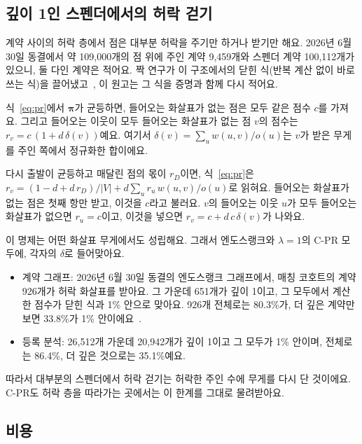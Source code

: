 \subsection{깊이 1인 스펜더에서의 허락 걷기}
\label{sec:closed}

계약 사이의 허락 층에서 점은 대부분 허락을 주기만 하거나 받기만 해요. 2026년 6월 30일 동결에서 약 109,000개의 점 위에 주인 계약 9,459개와 스펜더 계약 100,112개가 있으니, 둘 다인 계약은 적어요. 짝 연구가 이 구조에서의 닫힌 식(반복 계산 없이 바로 쓰는 식)을 끌어냈고~\cite{kwon2026companion}, 이 원고는 그 식을 증명과 함께 다시 적어요.

\begin{proposition}
\label{prop:closed}
식~\eqref{eq:pr}에서 $\boldsymbol\pi$가 균등하면, 들어오는 화살표가 없는 점은 모두 같은 점수 $c$를 가져요. 그리고 들어오는 이웃이 모두 들어오는 화살표가 없는 점 $v$의 점수는 $r_v=c\,(1+d\,\delta(v))$예요. 여기서 $\delta(v)=\sum_u w(u,v)/o(u)$는 $v$가 받은 무게를 주인 쪽에서 정규화한 합이에요.
\end{proposition}

\begin{proofko}
다시 출발이 균등하고 매달린 점의 몫이 $r_D$이면, 식~\eqref{eq:pr}은 $r_v=(1-d+d\,r_D)/|V|+d\sum_u r_u\,w(u,v)/o(u)$로 읽혀요. 들어오는 화살표가 없는 점은 첫째 항만 받고, 이것을 $c$라고 불러요. $v$의 들어오는 이웃 $u$가 모두 들어오는 화살표가 없으면 $r_u=c$이고, 이것을 넣으면 $r_v=c+d\,c\,\delta(v)$가 나와요.
\end{proofko}

이 명제는 어떤 화살표 무게에서도 성립해요. 그래서 엔도스랭크와 $\lambda=1$의 C-PR 모두에, 각자의 $\delta$로 들어맞아요.
\begin{itemize}
\item 계약 그래프: 2026년 6월 30일 동결의 엔도스랭크 그래프에서, 매칭 코호트의 계약 926개가 허락 화살표를 받아요. 그 가운데 651개가 깊이 1이고, 그 모두에서 계산한 점수가 닫힌 식과 1\% 안으로 맞아요. 926개 전체로는 80.3\%가, 더 깊은 계약만 보면 33.8\%가 1\% 안이에요~\cite{kwon2026companion}.
\item 등록 분석: 26,512개 가운데 20,942개가 깊이 1이고 그 모두가 1\% 안이며, 전체로는 86.4\%, 더 깊은 것으로는 35.1\%예요.
\end{itemize}
따라서 대부분의 스펜더에서 허락 걷기는 허락한 주인 수에 무게를 다시 단 것이에요. C-PR도 허락 층을 따라가는 곳에서는 이 한계를 그대로 물려받아요.

\subsection{비용}
\label{sec:cost}

